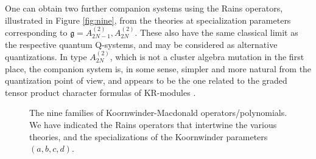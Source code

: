 \documentclass[12pt]{amsart}
\newcommand{\g}{{\mathfrak{g}}}
\newcommand{\half}{\frac{1}{2}}
\numberwithin{equation}{section}
\begin{document}
One can obtain two further companion systems using the Rains operators, illustrated in Figure \ref{fig:nine}, 
from the theories at specialization parameters corresponding to
$\g=A_{2N-1}^{(2)},A_{2N}^{(2)}$. These also have the same classical limit as the respective quantum Q-systems, and may be considered as alternative quantizations. In type $A_{2N}^{(2)}$, which is not a cluster algebra mutation in the first place, the companion system is, in some sense, simpler and more natural from the quantization point of view, and appears to be the one  related to the graded tensor product character formulas of KR-modules \cite{SimonTwisted}. 

\begin{figure}\label{fig:nine}
\caption{The nine families of Koornwinder-Macdonald operators/polynomials. We have indicated the Rains operators that intertwine the various theories, and the specializations of the Koornwinder parameters $(a,b,c,d)$.}\label{ninesystems}
\end{figure}
\end{document}
